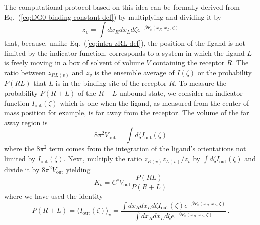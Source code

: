 \documentclass[9pt,bestpractices]{livecoms}
\begin{document}
The computational protocol based on this idea can be formally derived from Eq.~(\ref{eq:DG0-binding-constant-def}) by multiplying and dividing it by
\begin{equation}
z_v = \int dx_R dx_L d\zeta e^{-\beta \Psi_v(x_R, x_L, \zeta)}
\end{equation}
that, because, unlike Eq.~(\ref{eq:intra-zRL-def}), the position of the ligand is not limited by the indicator function, corresponds to a system in which the ligand $L$ is freely moving in a box of solvent of volume $V$ containing the receptor $R$. The ratio between $z_{RL(v)}$ and $z_v$ is the ensemble average of $I(\zeta)$ or the probability $P(RL)$ that $L$ is in the binding site of the receptor $R$. To measure the probability $P(R+L)$ of the $R+L$ unbound state, we consider an indicator function $I_{\mathrm{out}}(\zeta)$ which is one when the ligand, as measured from the center of mass position for example, is far away from the receptor. The volume of the far away region is
\begin{equation}
8 \pi^2 V_{\mathrm{out}} = \int d\zeta I_{\mathrm{out}}(\zeta)
\end{equation}
where the $8 \pi^2$ term comes from the integration of the ligand's orientations not limited by $I_{\mathrm{out}}(\zeta)$. Next, multiply the ratio $z_{R(v)} z_{L(v)}/z_v$ by $\int d\zeta I_{\mathrm{out}}(\zeta)$ and divide it by $8 \pi^2 V_{\mathrm{out}}$ yielding
\begin{equation}
K_b = C^\circ V_{\mathrm{out}} \frac{P(RL)}{P(R+L)}
\end{equation}
where we have used the identity
\begin{equation}
P(R+L) = \langle I_{\mathrm{out}}(\zeta) \rangle_v = \frac{\int dx_R dx_L d\zeta I_{\mathrm{out}}(\zeta) e^{-\beta \Psi_v(x_R, x_L, \zeta)}}{\int dx_R dx_L d\zeta e^{-\beta \Psi_v(x_R, x_L, \zeta)}} \, .
\end{equation}
\end{document}
